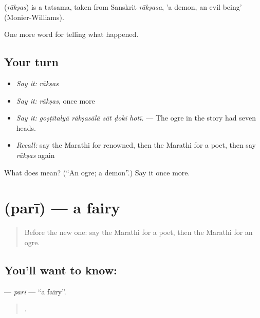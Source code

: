 \begin{cousinweb}
\textbf{} (\emph{rākṣas}) is a tatsama, taken from Sanskrit \emph{rākṣasa}, 'a demon, an evil being' (Monier-Williams).
\end{cousinweb}

\begin{grammarlens}[title={What you've built}]
One more word for telling what happened.
\end{grammarlens}

\subsection*{Your turn}
\begin{itemize}
\raggedright
  \item \emph{Say it:} \emph{rākṣas}
  \item \emph{Say it:} \emph{rākṣas}, once more
  \item \emph{Say it:} \emph{goṣṭītalyā rākṣasālā sāt ḍokī hotī.} — The ogre in the story had seven heads.
  \item \emph{Recall:} say the Marathi for renowned, then the Marathi for a poet, then say \emph{rākṣas} again
\end{itemize}

\begin{tcolorbox}[breakable,colback=teal!4,colframe=teal!35!black,title={Before you move on}]
What does  mean? (\textquotedblleft{}An ogre; a demon\textquotedblright{}.) Say it once more.
\end{tcolorbox}
\section[\texorpdfstring{\mr{परी} (parī)}{परी (parī)}]{ (parī) — a fairy}

\label{lesson:MR-C338-pari}



\begin{quote}
Before the new one: say the Marathi for a poet, then the Marathi for an ogre.
\end{quote}

\subsection*{You'll want to know: }
\textbf{} — \emph{parī} — \textquotedblleft{}a fairy\textquotedblright{}.

\begin{quote}
    .
\end{quote}

